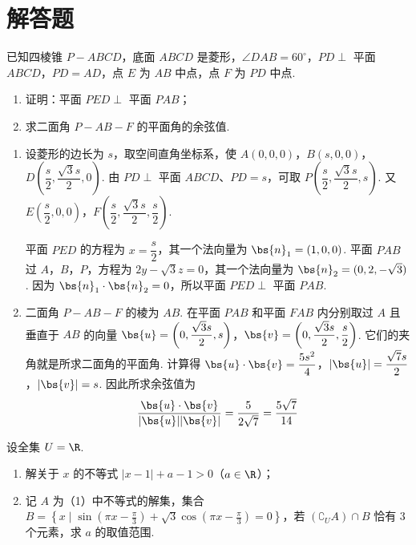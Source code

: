 \section{解答题}
\begin{problem}
已知四棱锥 \(P - ABCD\)，底面 \(ABCD\) 是菱形，\(\angle DAB = 60^{\circ}\)，\(PD \perp\) 平面 \(ABCD\)，\(PD = AD\)，点 \(E\) 为 \(AB\) 中点，点 \(F\) 为 \(PD\) 中点.

\begin{enumerate}
\item 证明：平面 \(PED \perp\) 平面 \(PAB\)；
\item 求二面角 \(P - AB - F\) 的平面角的余弦值.
\end{enumerate}

\end{problem}

\begin{solution}
\begin{enumerate}
\item
设菱形的边长为 \(s\)，取空间直角坐标系，使
\(A(0,0,0)\)，\(B(s,0,0)\)，\(D\left(\dfrac{s}{2},\dfrac{\sqrt3s}{2},0\right)\).
由 \(PD\perp\) 平面 \(ABCD\)、\(PD=s\)，可取
\(P\left(\dfrac{s}{2},\dfrac{\sqrt3s}{2},s\right)\). 又
\(E\left(\dfrac{s}{2},0,0\right)\)，\(F\left(\dfrac{s}{2},\dfrac{\sqrt3s}{2},\dfrac{s}{2}\right)\).

平面 \(PED\) 的方程为 \(x=\dfrac{s}{2}\)，其一个法向量为 \(\bs{n}_1=(1,0,0)\). 平面 \(PAB\) 过 \(A\)，\(B\)，\(P\)，方程为 \(2y-\sqrt3z=0\)，其一个法向量为 \(\bs{n}_2=(0,2,-\sqrt3)\). 因为
\(\bs{n}_1\cdot\bs{n}_2=0\)，所以平面 \(PED\perp\) 平面 \(PAB\).

\item
二面角 \(P-AB-F\) 的棱为 \(AB\). 在平面 \(PAB\) 和平面 \(FAB\) 内分别取过 \(A\) 且垂直于 \(AB\) 的向量
\(\bs{u}=\left(0,\dfrac{\sqrt3s}{2},s\right)\)，\(\bs{v}=\left(0,\dfrac{\sqrt3s}{2},\dfrac{s}{2}\right)\).
它们的夹角就是所求二面角的平面角. 计算得
\(\bs{u}\cdot\bs{v}=\dfrac{5s^2}{4}\)，\(|\bs{u}|=\dfrac{\sqrt7s}{2}\)，\(|\bs{v}|=s\).
因此所求余弦值为
\[
\frac{\bs{u}\cdot\bs{v}}{|\bs{u}||\bs{v}|}=\frac{5}{2\sqrt7}=\frac{5\sqrt7}{14}
\]
\end{enumerate}
\end{solution}

\begin{problem}
设全集 \(U = \R\).

\begin{enumerate}
\item 解关于 \(x\) 的不等式 \(|x - 1| + a - 1 > 0\)（\(a \in \R\)）；
\item 记 \(A\) 为（1）中不等式的解集，集合 \(B = \left\{x \mid \sin \left( \pi x - \frac{\pi}{3} \right) + \sqrt{3} \cos \left( \pi x - \frac{\pi}{3} \right) = 0 \right\}\)，若 \((\complement_U A) \cap B\) 恰有 \(3\) 个元素，求 \(a\) 的取值范围.
\end{enumerate}
\end{problem}

